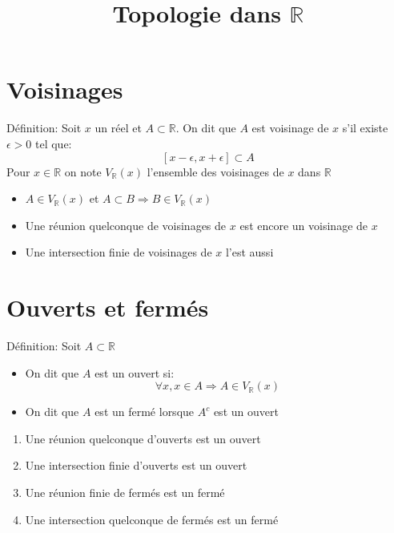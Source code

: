 \documentclass[fleqn]{article}
\title{Topologie dans $\mathbb{R}$}
\date{}
\begin{document}
\maketitle

\section{Voisinages}
D\'efinition: Soit $x$ un r\'eel et $A \subset \mathbb{R}$. On dit que $A$ est voisinage de $x$ s'il existe $\epsilon > 0$ tel que:
\[[x-\epsilon, x+\epsilon] \subset A\]
Pour $x \in \mathbb{R}$ on note $V_\mathbb{R}(x)$ l'ensemble des voisinages de $x$ dans $\mathbb{R}$
\begin{itemize}
	\item $A \in V_\mathbb{R}(x)$ et $A \subset B \Rightarrow B \in V_\mathbb{R}(x)$
	\item Une r\'eunion quelconque de voisinages de $x$ est encore un voisinage de $x$
	\item Une intersection finie de voisinages de $x$ l'est aussi
\end{itemize}

\section{Ouverts et ferm\'es}
D\'efinition: Soit $A \subset \mathbb{R}$
\begin{itemize}
	\item On dit que $A$ est un ouvert si:
		\[\forall x, x \in A \Rightarrow A \in V_\mathbb{R}(x)\]
	\item On dit que $A$ est un ferm\'e lorsque $A^c$ est un ouvert
\end{itemize}
\begin{enumerate}
	\item Une r\'eunion quelconque d'ouverts est un ouvert
	\item Une intersection finie d'ouverts est un ouvert
	\item Une r\'eunion finie de ferm\'es est un ferm\'e
	\item Une intersection quelconque de ferm\'es est un ferm\'e
\end{enumerate}
\end{document}
